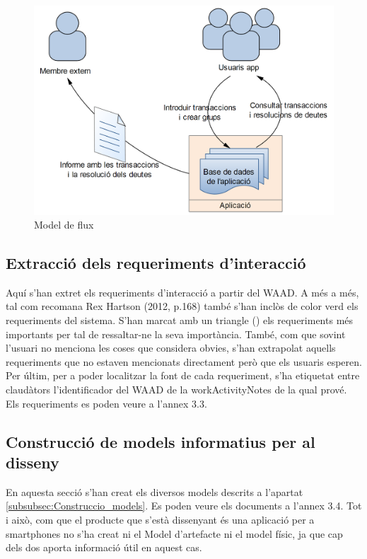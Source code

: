 \begin{figure}[htp]
\centering
\includegraphics[scale=0.5]{flow_model.png}
\caption{Model de flux}\label{fig:flow_model}
\end{figure}

\subsection{Extracció dels requeriments d'interacció}
Aquí s'han extret els requeriments d'interacció a partir del \ac{WAAD}. A més a més, tal com recomana Rex Hartson (2012, p.168) \cite{UX_Book} també s'han inclòs de color verd els requeriments del sistema. S'han marcat amb un triangle (\blacktriangle) els requeriments més importants per tal de ressaltar-ne la seva importància. També, com que sovint l'usuari no menciona les coses que considera obvies, s'han extrapolat aquells requeriments que no estaven mencionats directament però que els usuaris esperen. 
Per últim, per a poder localitzar la font de cada requeriment, s'ha etiquetat entre claudàtors l'identificador del \ac{WAAD} de la \gls{workActivityNotes} de la qual prové. Els requeriments es poden veure a l'annex 3.3.

\subsection{Construcció de models informatius per al disseny}
En aquesta secció s'han creat els diversos models descrits a l'apartat \ref{subsubsec:Construccio_models}. Es poden veure els documents a l'annex 3.4.
Tot i això, com que el producte que s'està dissenyant és una aplicació per a \glspl{smartphone} no s'ha creat ni el Model d'artefacte ni el model físic, ja que cap dels dos aporta informació útil en aquest cas. 

